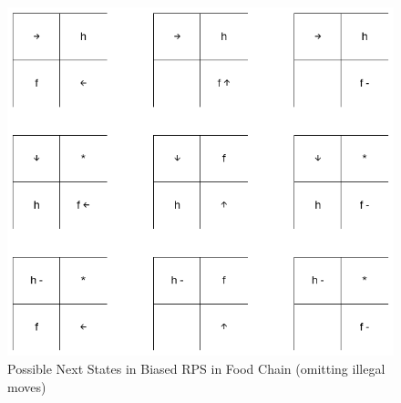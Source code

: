 \documentclass[]{interact}
\theoremstyle{plain}%
\theoremstyle{definition}
\theoremstyle{remark}
\begin{document}
\begin{figure}
\centering
\includegraphics{images/biased_rps_possible_next_states.png}
\caption{Possible Next States in Biased RPS in Food Chain (omitting illegal moves)}
\label{fig:biased_rps_in_food_chain_possible_next_states}
\end{figure}

\begin{table}
\label{table:biased_rps_in_food_chain_reward_matrix}
\end{table}
\end{document}
